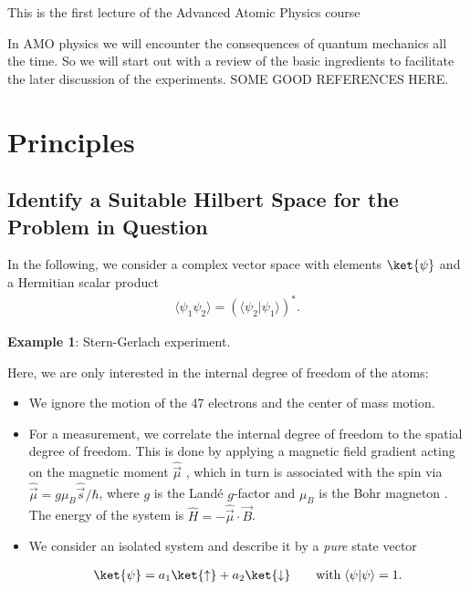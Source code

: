 This is the first lecture of the Advanced Atomic Physics course 

In AMO physics we will encounter the consequences of quantum mechanics all the time. So we will start out with a review of the basic ingredients to facilitate the later discussion of the experiments. SOME GOOD REFERENCES HERE.

\section{Principles}

\subsection{Identify a Suitable Hilbert Space for the Problem in Question}

In the following, we consider a complex vector space with elements $\ket{\psi}$ and a Hermitian scalar product
\begin{align}
				\langle\psi_1 \psi_2\rangle=(\langle{\psi_2}| \psi_1\rangle)^*.
\end{align}

\textbf{Example 1}: Stern-Gerlach experiment.

Here, we are only interested in the internal degree of freedom of the atoms:

\begin{itemize}
						\item 	We ignore the motion of the 47 electrons and the center of mass motion.
						\item 	For a measurement, we correlate the internal degree of freedom to the spatial degree of freedom. This is done by applying a magnetic field gradient acting on the magnetic moment $\hat{\vec{\mu}}$ , which in turn is associated with the spin via $\hat{\vec{\mu}} = g \mu_B \hat{\vec{s}}/\hbar$, where $g$ is the Landé $g$-factor  and $\mu_B$ is the Bohr magneton . The energy of the system is $\hat{H} = -\hat{\vec{\mu}} \cdot \vec{B}$.
						\item 	We consider an isolated system and describe it by a \emph{pure} state vector

\begin{align}
	\ket{\psi} = a_1 \ket{\uparrow} + a_2 \ket{\downarrow}  \qquad \text{with} \; \langle\psi | \psi\rangle = 1.
\end{align}
					
\end{itemize}